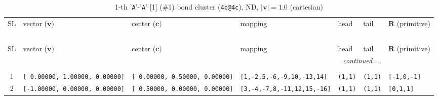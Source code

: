 \documentclass[fleqn,10pt,landscape]{jsarticle}
\begin{document}
\renewcommand{\arraystretch}{1.6}
\begin{longtable}[l]{cllllll}
\captionsetup{justification=raggedright, singlelinecheck=off}
\caption{1-th '\texttt{A}'-'\texttt{A}' [1] (\#1) bond cluster (\texttt{4b@4c}), ND, $|\bm{v}|=1.0$ (cartesian)}
 \\
 \hline \hline
SL & vector ($\bm{v})$ & center ($\bm{c})$ & mapping & head & tail & $\bm{R}$ (primitive) \\ \hline \endfirsthead

\multicolumn{6}{l}{\tablename\ \thetable{}} \\
 \hline \hline
SL & vector ($\bm{v})$ & center ($\bm{c})$ & mapping & head & tail & $\bm{R}$ (primitive) \\ \hline \endhead

 \hline \hline
\multicolumn{6}{r}{\footnotesize\it continued ...} \\ \endfoot

 \hline \hline
\multicolumn{6}{r}{} \\ \endlastfoot

1 & \texttt{[ 0.00000, 1.00000, 0.00000]} & \texttt{[ 0.00000, 0.50000, 0.00000]} & \texttt{[1,-2,5,-6,-9,10,-13,14]} & \texttt{(1,1)} & \texttt{(1,1)} & \texttt{[-1,0,-1]} \\ \hline
2 & \texttt{[-1.00000, 0.00000, 0.00000]} & \texttt{[ 0.50000, 0.00000, 0.00000]} & \texttt{[3,-4,-7,8,-11,12,15,-16]} & \texttt{(1,1)} & \texttt{(1,1)} & \texttt{[0,1,1]} \\
\end{longtable}
\renewcommand{\arraystretch}{1.6}
\end{document}
